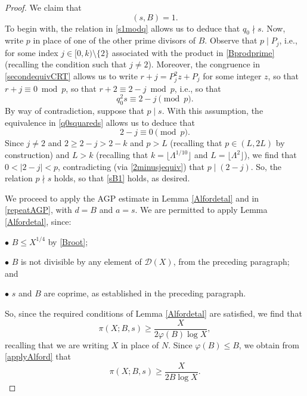 \documentclass[12pt]{article}
\begin{document}
\begin{proof}
 We claim that 
\begin{equation}\label{sB1} 
 (s, B) = 1. 
\end{equation}
 To begin with, the relation in \eqref{s1modq}
 allows us to deduce that $q_0 \nmid s$. 
 Now, write $p$ in place of one of the other prime divisors of $B$. 
 Observe that $p \mid P_j$, i.e., for some index $j \in [0, k) \setminus \{ 2 \}$
 associated with the product in \eqref{Bprodprime} (recalling the condition such that $j \neq 2$). 
 Moreover, the congruence in 
 \eqref{secondequivCRT} allows us to write 
 $r + j = P_j^2 z + P_j $ for some integer $z$, 
 so that 
 $ r + j \equiv 0 \bmod p$, 
 so that 
 $ r + 2 \equiv 2 - j \bmod p$, 
 i.e., so that 
\begin{equation}\label{q0squareds} 
 q_0^2 s \equiv 2 - j \pmod p. 
\end{equation}
 By way of contradiction, suppose that $p \mid s$. With this assumption, 
 the equivalence in 
 \eqref{q0squareds} allows us to deduce that 
\begin{equation}\label{2minusjequiv}
 2 - j \equiv 0 \pmod p. 
\end{equation}
 Since $j \neq 2$ and $2 \geq 2 - j > 2 -k$ and $p > L$ (recalling that $p \in (L, 2L)$ by construction)
 and $L > k$ (recalling that $k = \lfloor \Lambda^{1/10} \rfloor$ and $L = \lfloor \Lambda^2 \rfloor$), 
 we find that $0 < |2 - j | < p$, contradicting (via \eqref{2minusjequiv})
 that $p \mid (2-j)$. So, the relation $p \nmid s$ holds, so that 
 \eqref{sB1} holds, as desired. 

 We proceed to apply the AGP estimate in Lemma \ref{Alfordetal} and in \eqref{repeatAGP}, with $d = B$ and $a = s$. We are permitted 
 to apply Lemma \ref{Alfordetal}, since: 

\vspace{0.1in}

\noindent $\bullet$ $B \leq X^{1/4}$ by \eqref{Broot}; 

\vspace{0.1in}


\noindent $\bullet$ $B$ is not divisible by any element of $\mathcal{D}(X)$, from the preceding paragraph; and 

\vspace{0.1in}

\noindent $\bullet$ $s$ and $B$ are coprime, as established in the preceding paragraph. 

\vspace{0.1in}

\noindent So, since the required conditions of Lemma \ref{Alfordetal} are satisfied, we find that 
\begin{equation}\label{applyAlford}
 \pi(X; B, s) \geq \frac{X}{ 2 \varphi(B) \log X }, 
\end{equation}
 recalling that we are writing $X$ in place of $N$. Since $\varphi(B) \leq B$, we obtain 
 from \eqref{applyAlford} that 
\begin{equation}\label{piX2BlogX} 
 \pi(X; B, s) \geq \frac{X}{ 2 B \log X }. 
\end{equation}


\end{proof}
\end{document}
